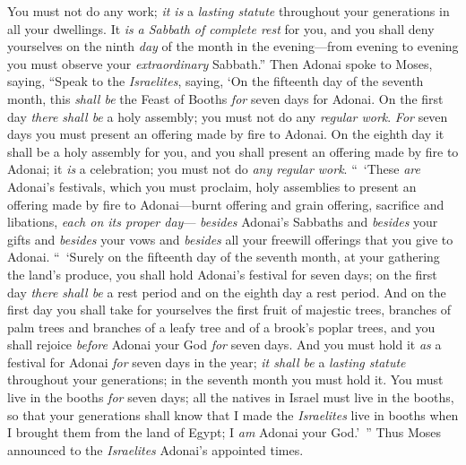 \begin{biblechapter}
\verse You must not do any work; \textit{it is} a \textit{lasting statute} throughout your generations in all your dwellings.
\verse It \textit{is} \textit{a Sabbath of complete rest} for you, and you shall deny yourselves on the ninth \textit{day} of the month in the evening—from evening to evening you must observe your \textit{extraordinary} Sabbath.”
 Then Adonai spoke to Moses, saying,
\verse “Speak to the \textit{Israelites}, saying, ‘On the fifteenth day of the seventh month, this \textit{shall be} the Feast of Booths \textit{for} seven days for Adonai.
\verse On the first day \textit{there shall be} a holy assembly; you must not do any \textit{regular work}.
\verse \textit{For} seven days you must present an offering made by fire to Adonai. On the eighth day it shall be a holy assembly for you, and you shall present an offering made by fire to Adonai; it \textit{is} a celebration; you must not do \textit{any regular work}.
 “ ‘These \textit{are} Adonai’s festivals, which you must proclaim, holy assemblies to present an offering made by fire to Adonai—burnt offering and grain offering, sacrifice and libations, \textit{each on its proper day}—
\verse \textit{besides} Adonai’s Sabbaths and \textit{besides} your gifts and \textit{besides} your vows and \textit{besides} all your freewill offerings that you give to Adonai.
\verse “ ‘Surely on the fifteenth day of the seventh month, at your gathering the land’s produce, you shall hold Adonai’s festival for seven days; on the first day \textit{there shall be} a rest period and on the eighth day a rest period.
\verse And on the first day you shall take for yourselves the first fruit of majestic trees, branches of palm trees and branches of a leafy tree and of a brook’s poplar trees, and you shall rejoice \textit{before} Adonai your God \textit{for} seven days.
\verse And you must hold it \textit{as} a festival for Adonai \textit{for} seven days in the year; \textit{it shall be} a \textit{lasting statute} throughout your generations; in the seventh month you must hold it.
\verse You must live in the booths \textit{for} seven days; all the natives in Israel must live in the booths,
\verse so that your generations shall know that I made the \textit{Israelites} live in booths when I brought them from the land of Egypt; I \textit{am} Adonai your God.’ ”
\verse Thus Moses announced to the \textit{Israelites} Adonai’s appointed times.
\end{biblechapter}

